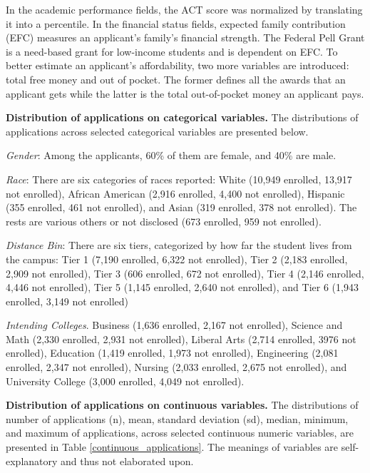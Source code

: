 \documentclass[12pt,english]{report}
\begin{document}
In the academic performance fields, the ACT score was normalized by translating it into a percentile.
In the financial status fields, expected family contribution (EFC) measures an applicant's family's financial strength. The Federal Pell Grant is a need-based grant for low-income students and is dependent on EFC. To better estimate an applicant's affordability, two more variables are introduced: total free money and out of pocket. The former defines all the awards that an applicant gets while the latter is the total out-of-pocket money an applicant pays.


\vspace{0.15in}
\noindent \textbf{Distribution of applications on categorical  variables. }  The distributions of applications across selected categorical  variables are presented below. 

\noindent \textit{Gender}: Among the applicants, 60\% of them are female, and 40\% are male.  

\noindent \textit{Race}:  There are six categories of races reported: White (10,949 enrolled, 13,917 not enrolled), African American (2,916 enrolled, 4,400 not enrolled), Hispanic (355 enrolled, 461 not enrolled), and Asian (319 enrolled, 378 not enrolled).  The rests are various others or not disclosed (673 enrolled, 959 not enrolled).

\noindent \textit{Distance Bin}: There are six tiers, categorized by how far the student lives from the campus:  Tier 1 (7,190 enrolled, 6,322 not enrolled), Tier 2 (2,183 enrolled, 2,909 not enrolled), Tier 3 (606 enrolled, 672 not enrolled), Tier 4 (2,146 enrolled, 4,446 not enrolled), Tier 5  (1,145 enrolled, 2,640 not enrolled), and Tier 6 (1,943 enrolled,  3,149 not enrolled) 

\noindent \textit{Intending Colleges}.  Business  (1,636 enrolled, 2,167 not enrolled), Science and Math (2,330 enrolled, 2,931 not enrolled), Liberal Arts (2,714 enrolled, 3976 not enrolled), Education (1,419 enrolled, 1,973 not enrolled), Engineering  (2,081 enrolled, 2,347 not enrolled), Nursing (2,033 enrolled, 2,675 not enrolled), and University College (3,000 enrolled, 4,049 not enrolled). 


\vspace{0.15in}
\noindent \textbf{Distribution of applications on continuous  variables. }  The distributions of number of applications (n), mean, standard deviation (sd), median, minimum, and maximum of applications, across selected continuous numeric variables, are presented in  Table \ref{continuous_applications}.  The meanings of variables are self-explanatory and thus not elaborated upon.
\end{document}
